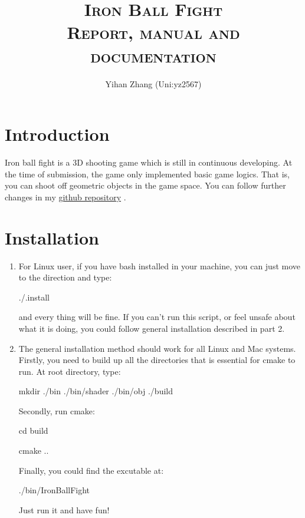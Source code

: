 \documentclass{article}
\begin{document}
\title{{\scshape Iron Ball Fight \\ {\large Report, manual and documentation}}}
\author{Yihan Zhang (Uni:yz2567)}
\maketitle

\section{Introduction}

Iron ball fight is a 3D shooting game which is still in continuous developing. 
At the time of submission, the game only implemented basic game logics. 
That is, you can shoot off geometric objects in the game space. 
You can follow further changes in my \href{https://github.com/Shironofenny/IronBallFight}{github repository} .

\section{Installation}

	\begin{enumerate}
	
		\item For Linux user, if you have bash installed in your machine, you can just move to the direction and type:

			{\hspace{5pt}\ttfamily ./.install}

			and every thing will be fine. 
			If you can't run this script, or feel unsafe about what it is doing, you could follow general installation described in part 2.

		\item The general installation method should work for all Linux and Mac systems. 
			Firstly, you need to build up all the directories that is essential for cmake to run. At root directory, type:

			{\hspace{5pt} \ttfamily mkdir ./bin ./bin/shader ./bin/obj ./build}

			Secondly, run cmake:

			{\hspace{5pt}\ttfamily cd build}
			
			{\hspace{5pt}\ttfamily cmake ..}

			Finally, you could find the excutable at:
			
			{\hspace{5pt}\ttfamily ./bin/IronBallFight}

			Just run it and have fun!

	\end{enumerate}
\end{document}

